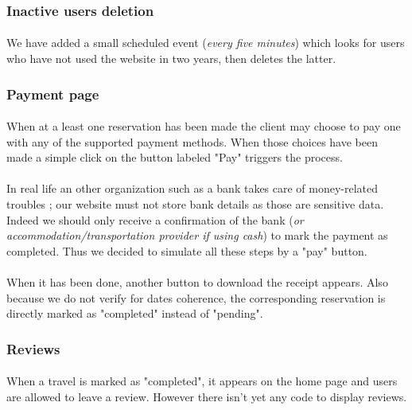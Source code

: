 \documentclass[11pt,a4paper,titlepage]{article}
\begin{document}
\subsubsection{Inactive users deletion}
\paragraph{}
We have added a small scheduled event (\textit{every five minutes}) which looks for users who have not used the website in two years, then deletes the latter.

\subsubsection{Payment page}
\paragraph{}
When at a least one reservation has been made the client may choose to pay one with any of the supported payment methods. When those choices have been made a simple click on the button labeled "Pay" triggers the process.
\paragraph{}
In real life an other organization such as a bank takes care of money-related troubles ; our website must not store bank details as those are sensitive data. Indeed we should only receive a confirmation of the bank (\textit{or accommodation/transportation provider if using cash}) to mark the payment as completed. Thus we decided to simulate all these steps by a "pay" button.
\paragraph{}
When it has been done, another button to download the receipt appears. Also because we do not verify for dates coherence, the corresponding reservation is directly marked as "completed" instead of "pending".

\subsubsection{Reviews}
\paragraph{}
When a travel is marked as "completed", it appears on the home page and users are allowed to leave a review. However there isn't yet any code to display reviews.
\end{document}
